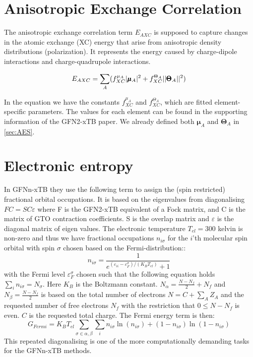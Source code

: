 \section{Anisotropic Exchange Correlation}

The anisotropic exchange correlation term $E_{AXC}$ is supposed to capture changes in the atomic exchange (XC) energy that arise from anisotropic density distributions (polarization). It represents the energy caused by charge-dipole interactions and charge-quadrupole interactions.

\begin{equation}
\begin{split}
        \E{AXC} &= \sum_{A} (f_{XC}^{\mu_A} |\pmb{\mu}_A|^2 + f_{XC}^{\Theta_A} ||\pmb{\Theta}_A||^2)\\
\end{split}
\end{equation}

In the equation we have the constants $f_{XC}^{\mu_A}$ and $f_{XC}^{\Theta_A}$, which are fitted element-specific parameters. The values for each element can be found in the supporting information of the GFN2-xTB paper\cite{bannwarth2019}.
We already defined both $\pmb{\mu}_A$ and $\pmb{\Theta}_A$ in \autoref{sec:AES}. 

\section{Electronic entropy}
In GFNn-xTB they use the following term to assign the (spin restricted) fractional orbital occupations. It is based on the eigenvalues from diagonalising $FC=SC\varepsilon$ where F is the GFN2-xTB equivalent of a Fock matrix, and C is the matrix of GTO contraction coefficients. S is the overlap matrix and $\varepsilon$ is the diagonal matrix of eigen values. The electronic temperature $T_{el}=300$ kelvin is non-zero and thus we have fractional occupations $n_{i\sigma}$ for the $i$'th molecular spin orbital with spin $\sigma$ chosen based on the Fermi-distribution:: 
\begin{equation}
    n_{i\sigma} = \frac{1}{e^{(\varepsilon_{ii}-\varepsilon^\sigma_F)/(K_BT_{el})}+1}
\end{equation}
with the Fermi level $\varepsilon_F^\sigma$ chosen such that the following equation holds $\sum_in_{i\sigma}=N_{\sigma}$. Here $K_B$ is the Boltzmann constant. $N_\alpha=\frac{N-N_f}{2}+N_f $ and $N_\beta=\frac{N-N_f}{2}$ is based on the total number of electrons $N=C+\sum_AZ_A$ and the requested number of free electrons $N_f$ with the restriction that $0\leq N-N_f$ is even. $C$ is the requested total charge. 
The Fermi energy term is then:
\begin{equation}
    G_{Fermi} = K_BT_{el}\sum_{\sigma\in\alpha,\beta}\sum_in_{i\sigma}\ln(n_{i\sigma}) + (1-n_{i\sigma})\ln(1-n_{i\sigma})
\end{equation}
This repeated diagonalising is one of the more computationally demanding tasks for the GFNn-xTB methods. 



